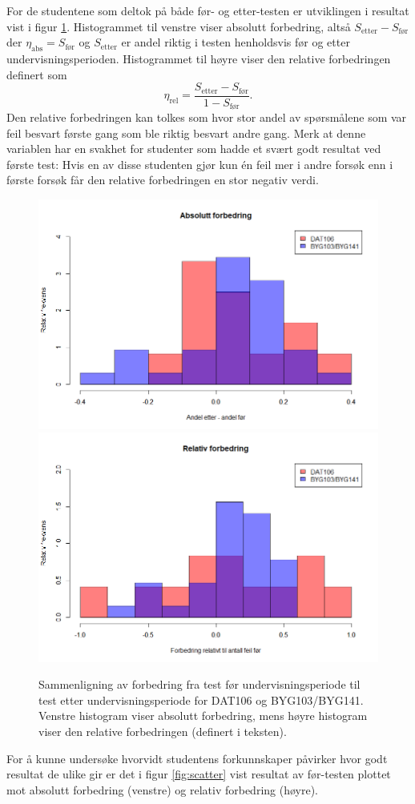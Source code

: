 \documentclass[a4paper,norsk,12pt]{article}
\begin{document}
For de studentene som deltok på både før- og etter-testen er utviklingen i resultat vist i figur \ref{fig:forbedring}. Histogrammet til venstre viser absolutt forbedring, altså $S_\text{etter}-S_\text{før}$ der $\eta_\text{abs} = S_\text{før}$ og $S_\text{etter}$ er andel riktig i testen henholdsvis før og etter undervisningsperioden. Histogrammet til høyre viser den relative forbedringen definert som
\begin{displaymath}
	\eta_\text{rel} = \frac{S_\text{etter}-S_\text{før}}{1 - S_\text{før}}.
\end{displaymath}
Den relative forbedringen kan tolkes som hvor stor andel av spørsmålene som var feil besvart første gang som ble riktig besvart andre gang. Merk at denne variablen har en svakhet for studenter som hadde et svært godt resultat ved første test: Hvis en av disse studenten gjør kun \'en feil mer i andre forsøk enn i første forsøk får den relative forbedringen en stor negativ verdi.
\begin{figure}[tp]
	\includegraphics[width=.48\textwidth]{./absForbedring}
	\includegraphics[width=.48\textwidth]{./relForbedring}
	\caption{Sammenligning av forbedring fra test før undervisningsperiode til test etter undervisningsperiode for DAT106 og BYG103/BYG141. Venstre histogram viser absolutt forbedring, mens høyre histogram viser den relative forbedringen (definert i teksten). }
	\label{fig:forbedring}
\end{figure}
For å kunne undersøke hvorvidt studentens forkunnskaper påvirker hvor godt resultat de ulike gir er det i figur \ref{fig:scatter} vist resultat av før-testen plottet mot absolutt forbedring (venstre) og relativ forbedring (høyre). 
\end{document}
